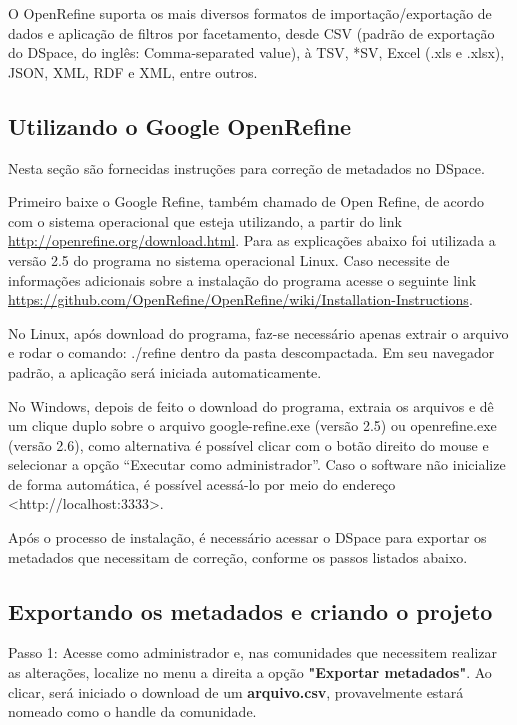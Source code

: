 \documentclass[12pt,hidelinks]{article}
\begin{document}
    \singlespacing
    
    O OpenRefine suporta os mais diversos formatos de importação/exportação de dados e aplicação de filtros por facetamento, desde CSV (padrão de exportação do DSpace, do inglês: Comma-separated value), à TSV, *SV, Excel (.xls e .xlsx), JSON, XML, RDF e XML, entre outros.
    
    \subsection{Utilizando o Google OpenRefine}
    
    Nesta seção são fornecidas instruções para correção de metadados no DSpace. 
    
    \singlespacing
    
    Primeiro baixe o Google Refine, também chamado de Open Refine, de acordo com o sistema operacional que esteja utilizando, a partir do link \url{http://openrefine.org/download.html}.
    Para as explicações abaixo foi utilizada a versão 2.5 do programa no sistema operacional Linux. Caso necessite de informações adicionais sobre a instalação do programa acesse o seguinte link
    \url{https://github.com/OpenRefine/OpenRefine/wiki/Installation-Instructions}.
    
    \singlespacing
    
    No Linux, após download do programa, faz-se necessário apenas extrair o arquivo e rodar o comando: ./refine dentro da pasta descompactada. Em seu navegador padrão, a aplicação será iniciada automaticamente.
    
    No Windows, depois de feito o download do programa, extraia os arquivos e dê um clique duplo sobre o arquivo google-refine.exe (versão 2.5) ou openrefine.exe (versão 2.6), como alternativa é possível clicar com o botão direito do mouse e selecionar a opção “Executar como administrador”. Caso o software não inicialize de forma automática, é possível acessá-lo por meio do endereço <http://localhost:3333>.
    
    Após o processo de instalação, é necessário acessar o DSpace para exportar os metadados que necessitam de correção, conforme os passos listados abaixo.
    
    \subsection{Exportando os metadados e criando o projeto}
    
    Passo 1: Acesse como administrador e, nas comunidades que necessitem realizar as alterações, localize no menu a direita a opção \textbf{"Exportar metadados"}. Ao clicar, será iniciado o download de um \textbf{arquivo.csv}, provavelmente estará nomeado como o handle da comunidade.
\end{document}
